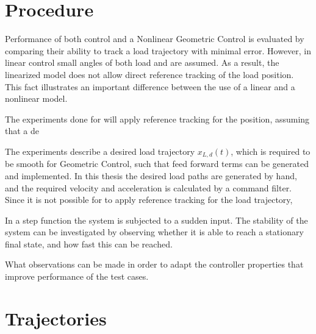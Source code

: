 \section{Procedure}\label{sec:set.proc}
Performance of both  control and a Nonlinear Geometric Control is evaluated by comparing their ability to track a load trajectory with minimal error. 
However, in linear control small angles of both load and  are assumed. As a result, the linearized model does not allow direct reference tracking of the load position. This fact illustrates an important difference between the use of a linear and a nonlinear model. 

The experiments done for  will apply reference tracking for the  position, assuming that  a de

The experiments describe a desired load trajectory $ x_{L,d}(t) $, which is required to be smooth for Geometric Control, such that feed forward terms can be generated and implemented. In this thesis the desired load paths are generated by hand, and the required velocity and acceleration is calculated by a command filter. Since it is not possible for  to apply reference tracking for the load trajectory, 

In a step function the system is subjected to a sudden input. The stability of the system can be investigated by observing whether it is able to reach a stationary final state, and how fast this can be reached. 

What observations can be made in order to adapt the controller properties that improve performance of the test cases.

\section{Trajectories}\label{sec:set.traj}

